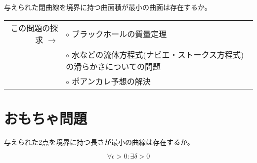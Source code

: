 \documentclass[dvipdfmx]{jsarticle}
\begin{document}
\begin{tcolorbox}[colback=white,title=\textbf{プラトーの問題}]
  与えられた閉曲線を境界に持つ曲面積が最小の曲面は存在するか。
\end{tcolorbox}

\begin{table}[h]
  \begin{tabular}{rl}
    この問題の探求 $\longrightarrow$ & $\circ$ ブラックホールの質量定理 \\
     & $\circ$ 水などの流体方程式(ナビエ・ストークス方程式)の滑らかさについての問題 \\
     & $\circ$ ポアンカレ予想の解決 \\
  \end{tabular}
\end{table}

\section{おもちゃ問題}
\begin{tcolorbox}[colback=white,title=\textbf{おもちゃ問題}]
与えられた2点を境界に持つ長さが最小の曲線は存在するか。
\end{tcolorbox}
\[
\forall \epsilon > 0 : \exists \delta > 0
\]
\end{document}
